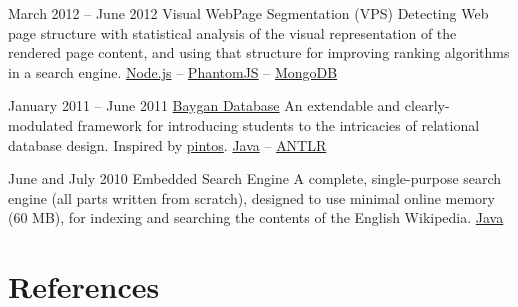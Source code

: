 \documentclass{tccv}
\begin{document}
{{\begin{project_list}
\vspace{-6pt}

\item{March 2012 -- June 2012}
     {}
     {Visual WebPage Segmentation {\large (VPS)}}
	 {Detecting Web page structure with statistical \mbox{analysis} of the visual representation of the rendered page \mbox{content}, and using that structure for improving ranking algorithms in a search engine.%
}
	 {%
	 	\href{http://nodejs.org}{Node.js} -- %
		\href{http://phantomjs.org}{PhantomJS} -- %
		\href{http://www.mongodb.org}{MongoDB}%
	 }

\vspace{-6pt}

\item{January 2011 -- June 2011}
	 {}
	 {\vspace{-14pt}\href{https://github.com/baygan/Baygan}{Baygan Database}}
	 {An extendable and clearly-modulated framework for introducing students to the intricacies of relational database design. Inspired by \href{http://www.stanford.edu/class/cs140/projects/pintos/pintos.html}{pintos}.%
}
	 {%
	 	\href{http://www.oracle.com/technetwork/java/}{Java} -- %
		\href{http://www.antlr.org}{ANTLR}%
	 }

\vspace{-14pt}
	 
\item{June and July 2010}
	 {}
	 {Embedded Search Engine}
	 {A complete, single-purpose search engine (all parts \mbox{written} from scratch), designed to use minimal online memory (60 MB), for indexing and searching the contents of the English Wikipedia.}
	 {%
		 \href{http://www.oracle.com/technetwork/java/}{Java}%
	 }

\end{project_list}



\vspace{-20pt}










\section{References}

}}
\end{document}
